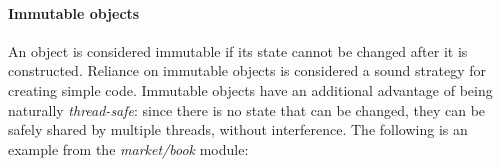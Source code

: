 \paragraph{Immutable objects}
An object is considered immutable if its state cannot be changed after it is constructed. Reliance on immutable objects is considered a sound strategy for creating simple code. Immutable objects have an additional advantage of being naturally \textit{thread-safe}: since there is no state that can be changed, they can be safely shared by multiple threads, without interference. The following is an example from the \textit{market/book} module:


